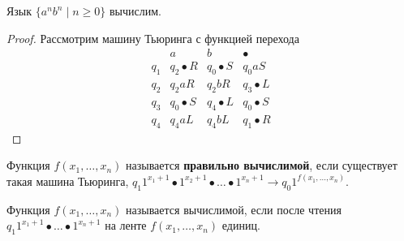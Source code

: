 \begin{statement}
Язык $\{ a^n b^n \mid n \geqslant 0 \}$ вычислим.
\end{statement}
\begin{proof}
Рассмотрим машину Тьюринга с функцией перехода
\begin{equation*}
\begin{matrix}
  & a & b & \bullet \\
q_1 & q_2 \bullet R & q_0 \bullet S & q_0 a S \\
q_2 & q_2 a R & q_2 b R & q_3 \bullet L \\
q_3 & q_0 \bullet S & q_4 \bullet L & q_0 \bullet S \\
q_4 & q_4 a L & q_4 b L & q_1 \bullet R
\end{matrix}
\end{equation*}
\end{proof}

Функция $f(x_1, \ldots, x_n)$ называется \textbf{правильно вычислимой}, если существует такая машина Тьюринга, $q_1 1^{x_1 + 1} \bullet 1^{x_2 + 1} \bullet \ldots \bullet 1^{x_n + 1} \to q_0 1^{f(x_1, \ldots, x_n)}$.

Функция $f(x_1, \ldots, x_n)$ называется вычислимой, если после чтения $q_1 1^{x_1 + 1} \bullet \ldots \bullet 1^{x_n + 1}$ на ленте $f(x_1, \ldots, x_n)$ единиц.